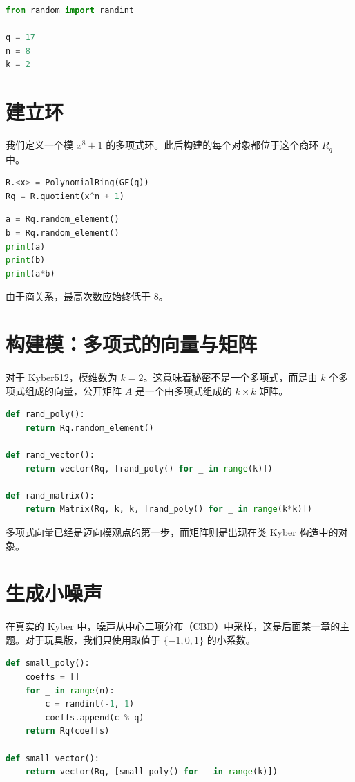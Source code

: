 \begin{lstlisting}[language=Python]
from random import randint

q = 17
n = 8
k = 2
\end{lstlisting}

\section{建立环}

我们定义一个模 $x^8+1$ 的多项式环。此后构建的每个对象都位于这个商环 $R_q$ 中。

\begin{lstlisting}[language=Python]
R.<x> = PolynomialRing(GF(q))
Rq = R.quotient(x^n + 1)
\end{lstlisting}

\begin{lstlisting}[language=Python]
a = Rq.random_element()
b = Rq.random_element()
print(a)
print(b)
print(a*b)
\end{lstlisting}

由于商关系，最高次数应始终低于 $8$。

\section{构建模：多项式的向量与矩阵}

对于 Kyber512，模维数为 $k=2$。这意味着秘密不是一个多项式，而是由 $k$ 个多项式组成的向量，公开矩阵 $A$ 是一个由多项式组成的 $k \times k$ 矩阵。

\begin{lstlisting}[language=Python]
def rand_poly():
    return Rq.random_element()

def rand_vector():
    return vector(Rq, [rand_poly() for _ in range(k)])

def rand_matrix():
    return Matrix(Rq, k, k, [rand_poly() for _ in range(k*k)])
\end{lstlisting}

多项式向量已经是迈向模观点的第一步，而矩阵则是出现在类 Kyber 构造中的对象。

\section{生成小噪声}

在真实的 Kyber 中，噪声从中心二项分布（CBD）中采样，这是后面某一章的主题。对于玩具版，我们只使用取值于 $\{-1,0,1\}$ 的小系数。

\begin{lstlisting}[language=Python]
def small_poly():
    coeffs = []
    for _ in range(n):
        c = randint(-1, 1)
        coeffs.append(c % q)
    return Rq(coeffs)

def small_vector():
    return vector(Rq, [small_poly() for _ in range(k)])
\end{lstlisting}

